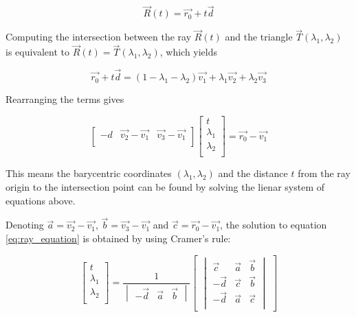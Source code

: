 \begin{equation}
    \label{eq:ray}
    \vec{R}(t) = \vec{r_0} + t\vec{d}
\end{equation}

Computing  the  intersection  between  the  ray  $\vec{R}(t)$  and  the triangle
$\vec{T}  (\lambda_1,  \lambda_2)$  is  equivalent  to  $\vec{R}(t)  =   \vec{T}
(\lambda_1, \lambda_2)$, which yields

\begin{equation}
    \vec{r_0} + t\vec{d} = (1-\lambda_1-\lambda_2)\vec{v_1} + \lambda_1\vec{v_2} + \lambda_2\vec{v_3}
\end{equation}

Rearranging the terms gives

\begin{equation}
    \label{eq:ray_equation}
    \begin{bmatrix} -d & \vec{v_2}-\vec{v_1} & \vec{v_3}-\vec{v_1} \\ \end{bmatrix}
    \begin{bmatrix} t \\ \lambda_1 \\ \lambda_2 \\ \end{bmatrix} = \vec{r_0} - \vec{v_1}
\end{equation}

This means the barycentric coordinates $(\lambda_1, \lambda_2)$ and the distance
$t$ from the ray origin to the intersection point can be  found  by  solving the
lienar system of equations above.

Denoting $\vec{a} = \vec{v_2} -  \vec{v_1}$,  $\vec{b}  = \vec{v_3} - \vec{v_1}$
and   $\vec{c}   =   \vec{r_0}   -   \vec{v_1}$,   the   solution  to   equation
\ref{eq:ray_equation} is obtained by using Cramer's rule:

\begin{equation}
    \label{eq:ray_equation_solved}
    \begin{bmatrix} t \\ \lambda_1 \\ \lambda_2 \\ \end{bmatrix}
    = \frac{1}{\begin{vmatrix} -\vec{d} & \vec{a} & \vec{b} \end{vmatrix}}
    \begin{bmatrix}\begin{vmatrix}
        \vec{c}  & \vec{a} & \vec{b} \\
        -\vec{d} & \vec{c} & \vec{b} \\
        -\vec{d} & \vec{a} & \vec{c} \\
    \end{vmatrix}\end{bmatrix}
\end{equation}

